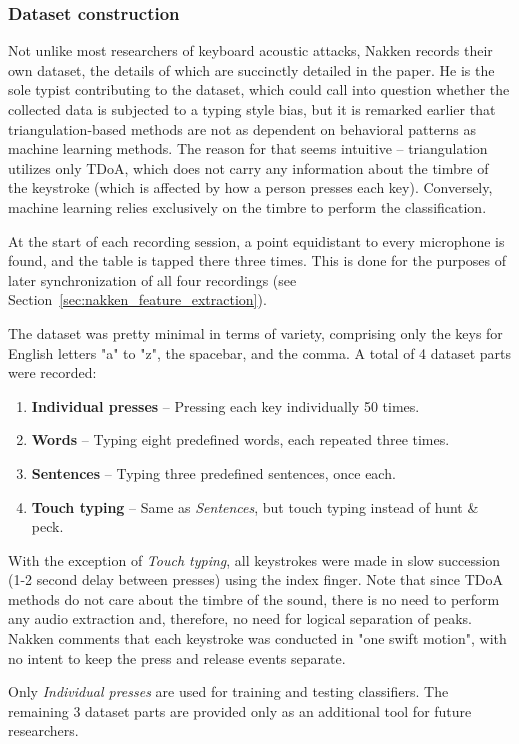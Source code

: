 \documentclass[../main.tex]{subfiles}
\begin{document}
\subsubsection{Dataset construction}
Not unlike most researchers of keyboard acoustic attacks, Nakken records their own
dataset, the details of which are succinctly detailed in the paper. He is the
sole typist contributing to the dataset, which could call into question whether
the collected data is subjected to a typing style bias, but it is remarked
earlier that triangulation-based methods are not as dependent on behavioral
patterns as machine learning methods. The reason for that seems intuitive
-- triangulation utilizes only TDoA, which does not carry any information about
the timbre of the keystroke (which is affected by how a person presses each key).
Conversely, machine learning relies exclusively on the timbre to perform the
classification.

At the start of each recording session, a point equidistant to every microphone
is found, and the table is tapped there three times. This is done for the
purposes of later synchronization of all four recordings (see Section~\ref{sec:nakken_feature_extraction}).

The dataset was pretty minimal in terms of variety, comprising only the
keys for English letters "a" to "z", the spacebar, and the comma. A total
of 4 dataset parts were recorded:
\begin{enumerate}
    \item \textbf{Individual presses} -- Pressing each key individually 50 times.
    \item \textbf{Words} -- Typing eight predefined words, each repeated three times.
    \item \textbf{Sentences} -- Typing three predefined sentences, once each.
    \item \textbf{Touch typing} -- Same as \textit{Sentences}, but touch
    typing instead of hunt \& peck.
\end{enumerate}
With the exception of \textit{Touch typing}, all keystrokes were made in slow
succession (1-2 second delay between presses) using the index finger. Note that
since TDoA methods do not care about the timbre of the sound, there is no need
to perform any audio extraction and, therefore, no need for logical separation
of peaks. Nakken comments that each keystroke was conducted in "one swift motion",
with no intent to keep the press and release events separate.

Only \textit{Individual presses} are used for training and testing classifiers.
The remaining 3 dataset parts are provided only as an additional tool for future
researchers.
\end{document}
